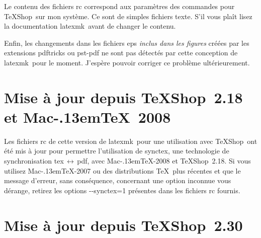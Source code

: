 \documentclass[11pt,french]{article}
\newcommand{\MacTeX}{Mac\kern-.13em\TeX}
\newcommand{\TS}{\textsf{\TeX Shop}}
\newcommand{\latexmk}{\textsf{latexmk}}
\newcommand{\mnu}[1]{\textsf{#1}}
\newcommand{\cmd}[1]{\textsf{#1}}
\newcommand{\Toto}{\,\(\leftrightarrow\)\,}
\begin{document}
Le contenu des fichiers \cmd{rc} correspond aux paramètres des commandes pour \TS\ sur mon système. Ce sont de simples fichiers texte. S'il vous plaît lisez la documentation \latexmk\ avant de changer le contenu.

Enfin, les changements dans les fichiers \cmd{eps} \emph{inclus dans les figures} créées par les extensions \cmd{pdftricks} ou \cmd{pst-pdf} ne sont pas détectés par cette conception de \latexmk\ pour le moment. J'espère pouvoir corriger ce problème ultérieurement.

%

\section{Mise à jour depuis \TS\ 2.18 et \MacTeX\ 2008}

Les fichiers \cmd{rc} de cette version de \latexmk\ pour une utilisation avec \TS\ ont été mis à jour pour permettre l'utilisation de \cmd{synctex}, une technologie de synchronisation \cmd{tex}\Toto\cmd{pdf}, avec \cmd{\MacTeX-2008} et \TS\ 2.18. Si vous utilisez \cmd{\MacTeX-2007} ou des distributions \TeX\ plus récentes et que le message d'erreur, sans conséquence, concernant une option inconnue vous dérange, retirez les options \cmd{-{}-synctex=1} présentes dans les fichiers \cmd{rc} fournis.

%

\section{Mise à jour depuis \TS\ 2.30}
\end{document}
